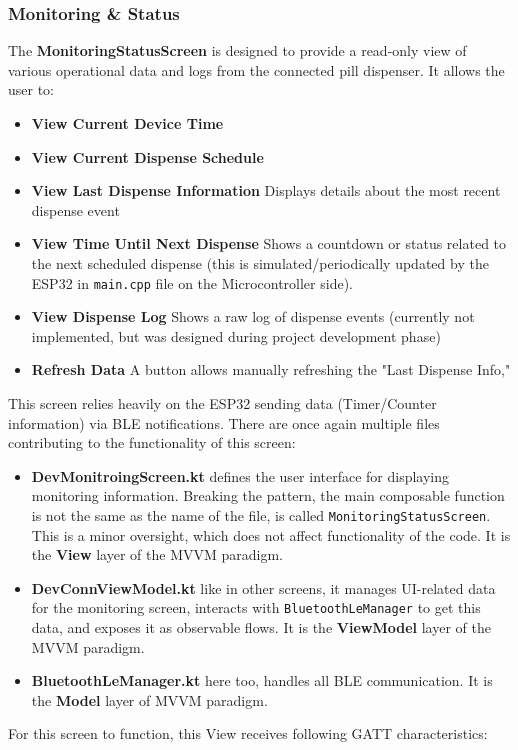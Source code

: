 \subsubsection{Monitoring \&  Status}
The \textbf{MonitoringStatusScreen} is designed to provide a read-only view of various operational data and logs from the connected pill dispenser. It allows the user to:
\begin{itemize}
	\item \textbf{View Current Device Time}	
	\item \textbf{View Current Dispense Schedule}
	\item \textbf{View Last Dispense Information} Displays details about the most recent dispense event 
	\item \textbf{View Time Until Next Dispense} Shows a countdown or status related to the next scheduled dispense (this is simulated/periodically updated by the ESP32 in \texttt{main.cpp} file on the Microcontroller side).
	\item \textbf{View Dispense Log} Shows a raw log of dispense events (currently not implemented, but was designed during project development phase)
	\item \textbf{Refresh Data} A button allows manually refreshing the "Last Dispense Info," 
\end{itemize}
This screen relies heavily on the ESP32 sending data (Timer/Counter information) via \ac{BLE} notifications. There are once again multiple files contributing to the functionality of this screen:
\begin{itemize}
	\item \textbf{DevMonitroingScreen.kt} defines the user interface for displaying monitoring information. Breaking the pattern, the main composable function is not the same as the name of the file, is called \texttt{MonitoringStatusScreen}. This is a minor oversight, which does not affect functionality of the code. It is the \textbf{View} layer of the \ac{MVVM} paradigm.
	\item \textbf{DevConnViewModel.kt} like in other screens, it manages UI-related data for the monitoring screen, interacts with \texttt{BluetoothLeManager} to get this data, and exposes it as observable flows. It is the \textbf{ViewModel} layer of the \ac{MVVM} paradigm.
	\item  \textbf{BluetoothLeManager.kt} here too, handles all \ac{BLE} communication. It is the \textbf{Model} layer of \ac{MVVM} paradigm.
\end{itemize}
For this screen to function, this View receives following \ac{GATT} characteristics:
